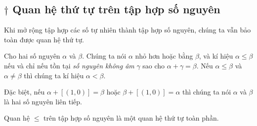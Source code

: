 \subsection{$\dagger$ Quan hệ thứ tự trên tập hợp số nguyên}

Khi mở rộng tập hợp các số tự nhiên thành tập hợp số nguyên, chúng ta vẫn bảo toàn được quan hệ thứ tự.

\begin{definition}
	Cho hai số nguyên $\alpha$ và $\beta$. Chúng ta nói $\alpha$ nhỏ hơn hoặc bằng $\beta$, và kí hiệu $\alpha\leq \beta$ nếu và chỉ nếu tồn tại \textit{số nguyên không âm} $\gamma$ sao cho $\alpha + \gamma = \beta$. Nếu $\alpha\leq \beta$ và $\alpha\ne \beta$ thì chúng ta kí hiệu $\alpha < \beta$.

	Đặc biệt, nếu $\alpha + [(1, 0)] = \beta$ hoặc $\beta + [(1, 0)] = \alpha$ thì chúng ta nói $\alpha$ và $\beta$ là hai số nguyên liên tiếp.
\end{definition}

\begin{theorem}
	Quan hệ $\leq$ trên tập hợp số nguyên là một quan hệ thứ tự toàn phần.
\end{theorem}

